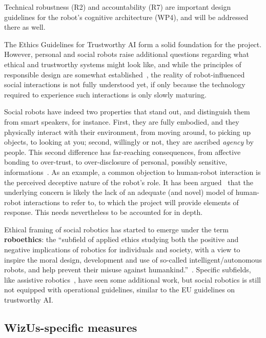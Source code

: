 \documentclass[11pt,a4paper]{report}
\newcommand{\project}{WizUs\xspace}
\begin{document}
Technical robustness (R2) and accountability (R7) are important design
guidelines for the robot's cognitive architecture (WP4), and will be addressed
there as well.


The Ethics Guidelines for Trustworthy AI form a solid foundation for the
project. However, personal and social robots raise additional questions
regarding what ethical and trustworthy systems might look like, and while the
principles of responsible design are somewhat established~\cite{stahl2016ethics,
bsi2016robots}, the reality of robot-influenced social interactions is not
fully understood yet, if only because the technology required to experience such
interactions is only slowly maturing. 

Social robots have indeed two properties that stand out, and distinguish them
from smart speakers, for instance.  First, they are fully embodied, and they
physically interact with their environment, from moving around, to picking up
objects, to looking at you; second, willingly or not, they are ascribed
\emph{agency} by people. This second difference has far-reaching consequences,
from affective bonding to over-trust, to over-disclosure of personal, possibly
sensitive, informations~\cite{martelaro2016tell,shiomi2017robot}.  As an
example, a common objection to human-robot interaction is the perceived
deceptive nature of the robot's role. It has been
argued~\cite{biscontilucidi2018companion} that the underlying concern is likely
the lack of an adequate (and novel) model of human-robot interactions to refer
to, to which the project will provide elements of response. This needs
nevertheless to be accounted for in depth.

Ethical framing of social robotics has started to
emerge under the term \textbf{roboethics}: the ``subfield of applied ethics
studying both the positive and negative implications of robotics for individuals
and society, with a view to inspire the moral design, development and use of
so-called intelligent/autonomous robots, and help prevent their misuse against
humankind.''~\cite{allen2011robot}. Specific subfields, like assistive
robotics~\cite{sharkey2012granny}, have seen some additional work, but social
robotics is still not equipped with operational guidelines, similar to the EU
guidelines on trustworthy AI.

\subsection{\project-specific measures}
\end{document}
